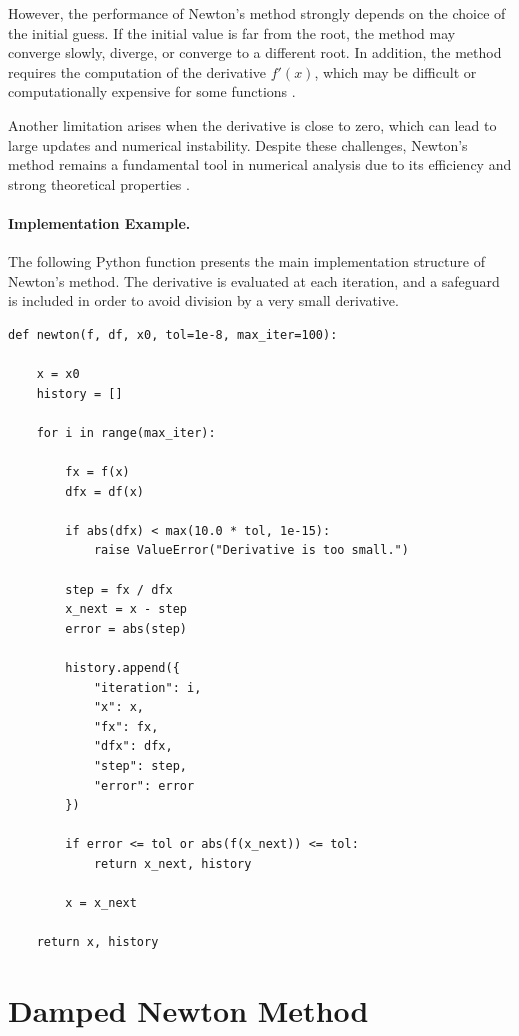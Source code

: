 However, the performance of Newton's method strongly depends on the choice of the initial guess. If the initial value is far from the root, the method may converge slowly, diverge, or converge to a different root. In addition, the method requires the computation of the derivative \( f'(x) \), which may be difficult or computationally expensive for some functions \cite{kelley}.

Another limitation arises when the derivative is close to zero, which can lead to large updates and numerical instability. Despite these challenges, Newton's method remains a fundamental tool in numerical analysis due to its efficiency and strong theoretical properties \cite{chapra}.

\paragraph{Implementation Example.}

The following Python function presents the main implementation structure of Newton's method. The derivative is evaluated at each iteration, and a safeguard is included in order to avoid division by a very small derivative.

\begin{lstlisting}
def newton(f, df, x0, tol=1e-8, max_iter=100):

    x = x0
    history = []

    for i in range(max_iter):

        fx = f(x)
        dfx = df(x)

        if abs(dfx) < max(10.0 * tol, 1e-15):
            raise ValueError("Derivative is too small.")

        step = fx / dfx
        x_next = x - step
        error = abs(step)

        history.append({
            "iteration": i,
            "x": x,
            "fx": fx,
            "dfx": dfx,
            "step": step,
            "error": error
        })

        if error <= tol or abs(f(x_next)) <= tol:
            return x_next, history

        x = x_next

    return x, history
\end{lstlisting}

\section{Damped Newton Method}

